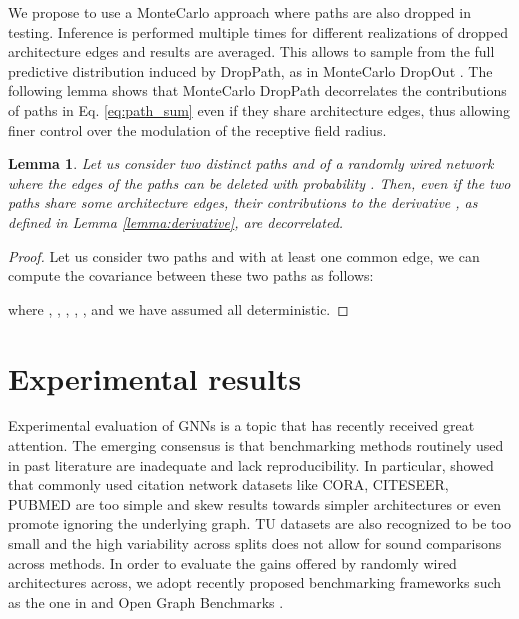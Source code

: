 \documentclass[10pt,twocolumn,twoside]{IEEEtran}
\newtheorem{lemma}[theorem]{Lemma}
\begin{document}
We propose to use a MonteCarlo approach where paths are also dropped in testing. Inference is performed multiple times for different realizations of dropped architecture edges and results are averaged. This allows to sample from the full predictive distribution induced by DropPath, as in MonteCarlo DropOut \cite{gal2015dropout}.
The following lemma shows that MonteCarlo DropPath decorrelates the contributions of paths in Eq. \eqref{eq:path_sum} even if they share architecture edges, thus allowing finer control over the modulation of the receptive field radius.
\begin{lemma}
Let us consider two distinct paths  and  of a randomly wired network where the edges of the paths can be deleted with probability . Then, even if the two paths share some architecture edges, their contributions to the derivative , as
defined in Lemma \ref{lemma:derivative}, are decorrelated. \end{lemma}
\begin{proof}
Let us consider two paths  and  with at least one common edge, we can compute the covariance between these two paths as follows:


where  , , , , , and we have assumed all  deterministic.
\end{proof}







\section{Experimental results}

Experimental evaluation of GNNs is a topic that has recently received great attention. The emerging consensus is that benchmarking methods routinely used in past literature are inadequate and lack reproducibility. In particular, \cite{vignac2020choice} showed that commonly used citation network datasets like CORA, CITESEER, PUBMED are too simple and skew results towards simpler architectures or even promote ignoring the underlying graph. TU datasets are also recognized to be too small \cite{errica2019fair} and the high variability across splits does not allow for sound comparisons across methods. In order to evaluate the gains offered by randomly wired architectures across, we adopt recently proposed benchmarking frameworks such as the one in \cite{dwivedi2020benchmarking} and Open Graph Benchmarks \cite{hu2020ogb}. 
\end{document}
